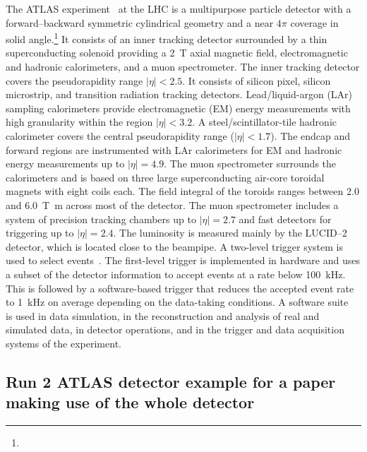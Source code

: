 The ATLAS experiment~\cite{PERF-2007-01} at the LHC is a multipurpose particle detector
with a forward--backward symmetric cylindrical geometry and a near \(4\pi\) coverage in 
solid angle.\footnote{\AtlasCoordFootnote}
It consists of an inner tracking detector surrounded by a thin superconducting solenoid
providing a \qty{2}{\tesla} axial magnetic field, electromagnetic and hadronic calorimeters, and a muon spectrometer.
The inner tracking detector covers the pseudorapidity range \(|\eta| < 2.5\).
It consists of silicon pixel, silicon microstrip, and transition radiation tracking detectors.
Lead/liquid-argon (LAr) sampling calorimeters provide electromagnetic (EM) energy measurements
with high granularity within the region \(|\eta|< 3.2\).
A steel/scintillator-tile hadronic calorimeter covers the central pseudorapidity range (\(|\eta| < 1.7\)).
The endcap and forward regions are instrumented with LAr calorimeters
for EM and hadronic energy measurements up to \(|\eta| = 4.9\).
The muon spectrometer surrounds the calorimeters and is based on
three large superconducting air-core toroidal magnets with eight coils each.
The field integral of the toroids ranges between \num{2.0} and \qty{6.0}{\tesla\metre}
across most of the detector. 
The muon spectrometer includes a system of precision tracking chambers up to \(|\eta| = 2.7\) and fast detectors for triggering up to \(|\eta| = 2.4\).
The luminosity is measured mainly by the LUCID--2~\cite{LUCID2} detector, which is located close to the beampipe.
A two-level trigger system is used to select events~\cite{TRIG-2016-01}. 
The first-level trigger is implemented in hardware and uses a subset of the detector information
to accept events at a rate below \qty{100}{\kHz}.
This is followed by a software-based trigger that
reduces the accepted event rate to \qty{1}{\kHz} on average
depending on the data-taking conditions.
A software suite~\cite{SOFT-2022-02} is used in data simulation, in the reconstruction
and analysis of real and simulated data, in detector operations, and in the trigger and data acquisition
systems of the experiment.


\subsection{Run 2 ATLAS detector example for a paper making use of the whole detector}
\label{sec:atlas2b}

